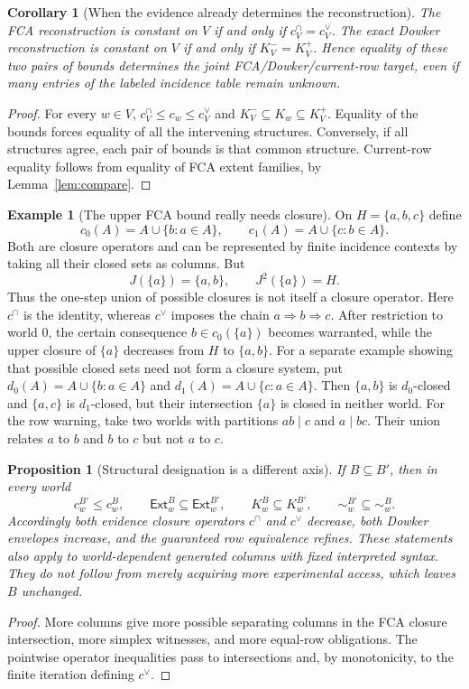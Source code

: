 \documentclass[11pt]{article}
\newtheorem{proposition}[theorem]{Proposition}
\newtheorem{corollary}[theorem]{Corollary}
\theoremstyle{definition}
\newtheorem{example}[theorem]{Example}
\newcommand{\Ext}{\mathsf{Ext}}
\begin{document}
\begin{corollary}[When the evidence already determines the reconstruction]\label{cor:determined}
The FCA reconstruction is constant on $V$ if and only if $c^{\cap}_V=c^{\vee}_V$. The exact Dowker reconstruction is constant on $V$ if and only if $K^-_V=K^+_V$. Hence equality of these two pairs of bounds determines the joint FCA/Dowker/current-row target, even if many entries of the labeled incidence table remain unknown.
\end{corollary}
\begin{proof}
For every $w\in V$, $c^{\cap}_V\le c_w\le c^{\vee}_V$ and $K^-_V\subseteq K_w\subseteq K^+_V$. Equality of the bounds forces equality of all the intervening structures. Conversely, if all structures agree, each pair of bounds is that common structure. Current-row equality follows from equality of FCA extent families, by Lemma~\ref{lem:compare}.
\end{proof}

\begin{example}[The upper FCA bound really needs closure]\label{ex:iteration}
On $H=\{a,b,c\}$ define
\[
 c_0(A)=A\cup\{b:a\in A\},\qquad c_1(A)=A\cup\{c:b\in A\}.
\]
Both are closure operators and can be represented by finite incidence contexts by taking all their closed sets as columns. But
\[
 J(\{a\})=\{a,b\},\qquad J^2(\{a\})=H.
\]
Thus the one-step union of possible closures is not itself a closure operator. Here $c^{\cap}$ is the identity, whereas $c^{\vee}$ imposes the chain $a\Rightarrow b\Rightarrow c$. After restriction to world $0$, the certain consequence $b\in c_0(\{a\})$ becomes warranted, while the upper closure of $\{a\}$ decreases from $H$ to $\{a,b\}$. For a separate example showing that possible closed sets need not form a closure system, put $d_0(A)=A\cup\{b:a\in A\}$ and $d_1(A)=A\cup\{c:a\in A\}$. Then $\{a,b\}$ is $d_0$-closed and $\{a,c\}$ is $d_1$-closed, but their intersection $\{a\}$ is closed in neither world. For the row warning, take two worlds with partitions $ab\mid c$ and $a\mid bc$. Their union relates $a$ to $b$ and $b$ to $c$ but not $a$ to $c$.
\end{example}

\begin{proposition}[Structural designation is a different axis]\label{prop:designation}
If $B\subseteq B'$, then in every world
\[
 c^{B'}_w\le c^B_w,\qquad
 \Ext^B_w\subseteq\Ext^{B'}_w,\qquad
 K^B_w\subseteq K^{B'}_w,\qquad
 {\sim}^{B'}_w\subseteq{\sim}^B_w.
\]
Accordingly both evidence closure operators $c^{\cap}$ and $c^{\vee}$ decrease, both Dowker envelopes increase, and the guaranteed row equivalence refines. These statements also apply to world-dependent generated columns with fixed interpreted syntax. They do not follow from merely acquiring more experimental access, which leaves $B$ unchanged.
\end{proposition}
\begin{proof}
More columns give more possible separating columns in the FCA closure intersection, more simplex witnesses, and more equal-row obligations. The pointwise operator inequalities pass to intersections and, by monotonicity, to the finite iteration defining $c^{\vee}$.
\end{proof}
\end{document}
